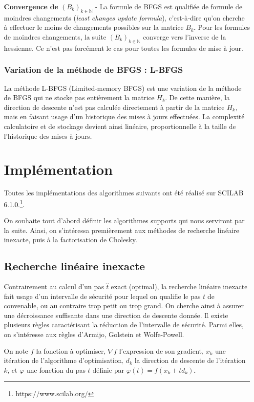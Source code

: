 \documentclass[3p, twocolumn]{elsarticle}
\begin{document}
\begin{rmk}
    \textbf{Convergence de $(B_k)_{k\in \mathbb{N}}$} - La formule de BFGS est qualifiée de formule de moindres changements (\textit{least changes update formula}), c'est-à-dire qu'on cherche à effectuer le moins de changements possibles sur la matrice $B_k$. Pour les formules de moindres changements, la suite $(B_k)_{k\in \mathbb{N}}$ converge vers l'inverse de la hessienne. Ce n'est pas forcément le cas pour toutes les formules de mise à jour.
\end{rmk}

\subsubsection{Variation de la méthode de BFGS : L-BFGS}
La méthode L-BFGS (Limited-memory BFGS) est une variation de la méthode de BFGS qui ne stocke pas entièrement la matrice $H_k$. De cette manière, la direction de descente n'est pas calculée directement à partir de la matrice $H_k$, mais en faisant usage d'un historique des mises à jours effectuées. La complexité calculatoire et de stockage devient ainsi linéaire, proportionnelle à la taille de l'historique des mises à jours.

\section{Implémentation}
Toutes les implémentations des algorithmes suivants ont été réalisé sur SCILAB 6.1.0.\footnote{https://www.scilab.org/}.

On souhaite tout d'abord définir les algorithmes supports qui nous serviront par la suite. Ainsi, on s'intéressa premièrement aux méthodes de recherche linéaire inexacte, puis à la factorisation de Cholesky.

\subsection{Recherche linéaire inexacte}
Contrairement au calcul d'un pas $\hat t$ exact (optimal), la recherche linéaire inexacte fait usage d'un intervalle de sécurité pour lequel on qualifie le pas $t$ de convenable, ou au contraire trop petit ou trop grand. On cherche ainsi à assurer une décroissance suffisante dans une direction de descente donnée. Il existe plusieurs règles caractérisant la réduction de l'intervalle de sécurité. Parmi elles, on s'intéresse aux règles d'Armijo, Golstein et Wolfe-Powell.

On note $f$ la fonction à optimiser, $\nabla f$ l'expression de son gradient, $x_k$ une itération de l'algorithme d'optimisation, $d_k$ la direction de descente de l'itération $k$, et $\varphi$ une fonction du pas $t$ définie par $\varphi(t)=f(x_k+td_k)$.
\end{document}
